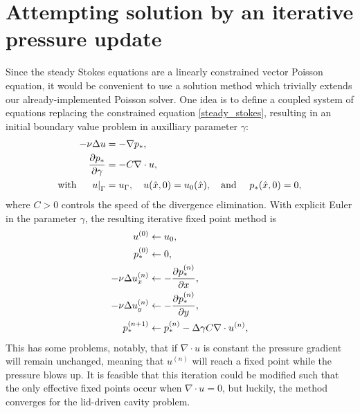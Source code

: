 \section{Attempting solution by an iterative pressure update}
Since the steady Stokes equations are a linearly constrained vector Poisson equation,
it would be convenient to use a solution method which trivially extends our already-implemented Poisson solver.
One idea is to define a coupled system of equations replacing the constrained equation \eqref{steady_stokes}, resulting in an initial boundary value problem
in auxilliary parameter $\gamma$:
\begin{equation}
\begin{split}
    -\nu\Delta u &= -\nabla p_*,\\
    \frac{\partial p_*}{\partial \gamma} &= -C\nabla\cdot u,\\
    \text{with \quad} \left.u\right|_\Gamma &= u_\Gamma,\quad u(\hat{x}, 0) = u_0(\hat{x}), \text{\quad and \quad} p_*(\hat{x}, 0) = 0,
\end{split}
\end{equation}
where $C > 0$ controls the speed of the divergence elimination.
With explicit Euler in the parameter $\gamma$, the resulting iterative fixed point method is
\begin{equation}
\begin{split}
    u^{(0)} &\leftarrow u_0,\\
    p_*^{(0)} &\leftarrow 0,\\
    -\nu\Delta u_x^{(n)} &\leftarrow -\frac{\partial p_*^{(n)}}{\partial x},\\
    -\nu\Delta u_y^{(n)} &\leftarrow -\frac{\partial p_*^{(n)}}{\partial y},\\
    p_*^{(n+1)} &\leftarrow p_*^{(n)} - \Delta\gamma C\nabla\cdot u^{(n)},
\end{split}
\end{equation}
This has some problems, notably, that if $\nabla\cdot u$ is constant the pressure gradient will remain unchanged, meaning
that $u^{(n)}$ will reach a fixed point while the pressure blows up. It is feasible that this iteration could be modified such that the only
effective fixed points occur when $\nabla\cdot u = 0$, but luckily, the method converges for the lid-driven cavity problem.

